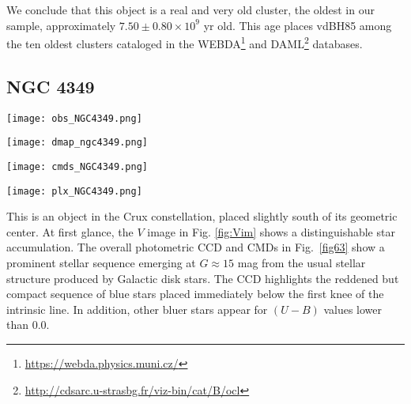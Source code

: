 \documentclass[draft]{aa}
\begin{document}
We conclude that this object is a real and very old cluster, the oldest in our
sample, approximately $7.50\pm0.80\times10^9$ yr old. This age places
vdBH85 among the ten oldest clusters cataloged in the
WEBDA\footnote{\url{https://webda.physics.muni.cz/}} and
DAML\footnote{\url{http://cdsarc.u-strasbg.fr/viz-bin/cat/B/ocl}}
\citep{Dias_2002} databases.




\subsection{NGC 4349}

\begin{figure*}[ht]
    \centering
    \texttt{[image: obs\_NGC4349.png]}
    \caption{Idem Fig. \ref{fig:photom_vdBH85} for NGC 4349.}
    \label{fig63}
\end{figure*}
\begin{figure*}[ht]
    \centering
    \texttt{[image: dmap\_ngc4349.png]}
    \caption{Idem Fig. \ref{fig:struct_vdBH85} for NGC 4349.}
    \label{fig64}
\end{figure*}
\begin{figure*}[ht]
    \centering
    \texttt{[image: cmds\_NGC4349.png]}
    \caption{Idem Fig. \ref{fig:fundpars_vdBH85} for NGC 4349.}
    \label{fig65}
\end{figure*}
\begin{figure*}[ht]
    \centering
    \texttt{[image: plx\_NGC4349.png]}
    \caption{Idem Fig. \ref{fig:plx_bys_vdBH85} for NGC 4349.}
    \label{fig:plx_bys_NGC4349}
\end{figure*}


This is an object in the Crux constellation, placed slightly south of its
geometric center. At first glance, the $V$ image in Fig. \ref{fig:Vim} shows a
distinguishable star accumulation. The overall photometric CCD and CMDs in
Fig.~\ref{fig63} show a prominent stellar sequence emerging at $G\approx15$ mag
from the usual stellar structure produced by Galactic disk stars.
The CCD highlights the reddened but compact sequence of blue stars placed
immediately below the first knee of the intrinsic line. In addition, other
bluer stars appear for $(U-B)$ values lower than 0.0.\\ 
\end{document}
